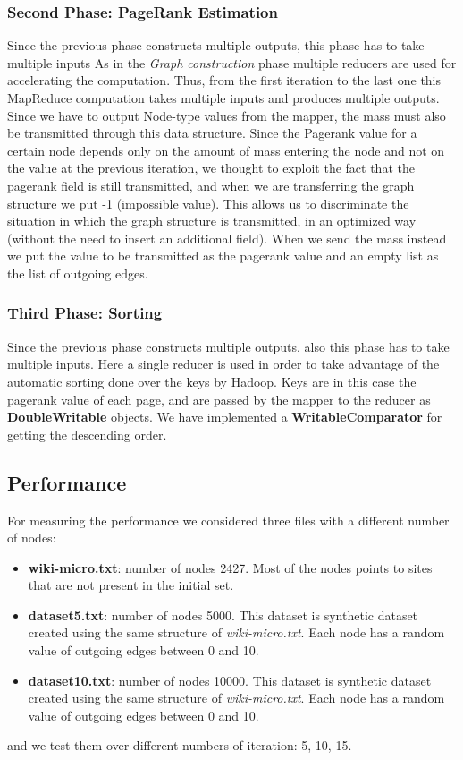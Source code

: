 \subsubsection{Second Phase: PageRank Estimation}
Since the previous phase constructs multiple outputs, this phase has to take multiple inputs
As in the \textit{Graph construction} phase multiple reducers are used for accelerating the computation. Thus, from the first iteration to the last one this MapReduce computation takes multiple inputs and produces multiple outputs.
\newline Since we have to output Node-type values from the mapper, the mass must also be transmitted through this data structure. Since the Pagerank value for a certain node depends only on the amount of mass entering the node and not on the value at the previous iteration, we thought to exploit the fact that the pagerank field is still transmitted, and when we are transferring the graph structure we put -1 (impossible value). This allows us to discriminate the situation in which the graph structure is transmitted, in an optimized way (without the need to insert an additional field). When we send the mass instead we put the value to be transmitted as the pagerank value and an empty list as the list of outgoing edges.

\subsubsection{Third Phase: Sorting}
Since the previous phase constructs multiple outputs, also this phase has to take multiple inputs. Here a single reducer is used in order to take advantage of the automatic sorting done over the keys by Hadoop. Keys are in this case the pagerank value of each page, and are passed by the mapper to the reducer as \textbf{DoubleWritable} objects. We have implemented a \textbf{WritableComparator} for getting the descending order.

\subsection{Performance}
For measuring the performance we considered three files with a different number of nodes:
\begin{itemize}
	\item \textbf{wiki-micro.txt}: number of nodes 2427. Most of the nodes points to sites that are not present in the initial set.
	\item \textbf{dataset5.txt}: number of nodes 5000. This dataset is synthetic dataset created using the same structure of \textit{wiki-micro.txt}. Each node has a random value of outgoing edges between 0 and 10.
	\item \textbf{dataset10.txt}: number of nodes 10000. This dataset is synthetic dataset created using the same structure of \textit{wiki-micro.txt}. Each node has a random value of outgoing edges between 0 and 10.
\end{itemize}
and we test them over different numbers of iteration: 5, 10, 15.

